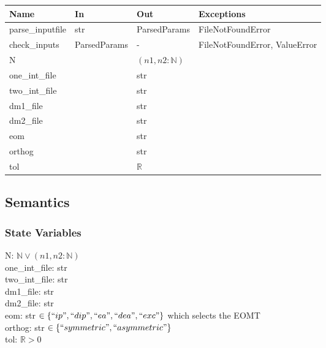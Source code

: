 \documentclass[12pt, titlepage]{article}
\begin{document}
\begin{center}
	\begin{tabular}{p{2.7cm} p{4cm} p{4cm} p{2cm}}
		\hline
		\textbf{Name} & \textbf{In} & \textbf{Out} & \textbf{Exceptions} \\
		\hline
		parse\_inputfile& str& ParsedParams & FileNotFoundError \\
		check\_inputs& ParsedParams& - & FileNotFoundError, ValueError \\
		N& & $(n1, n2:\mathbb{N})$ & \\
		one\_int\_file& & str & \\
		two\_int\_file& & str & \\
		dm1\_file& & str & \\
		dm2\_file& & str & \\
		eom& & str & \\
		orthog& & str & \\
		tol& & $\mathbb{R}$ & \\
		\hline
	\end{tabular}
\end{center}

\subsection{Semantics}

\subsubsection{State Variables}

N: $\mathbb{N} \lor (n1, n2:\mathbb{N})$\\
one\_int\_file: str\\
two\_int\_file: str\\
dm1\_file: str\\
dm2\_file: str\\
eom: str $\in \{``ip", ``dip", ``ea", ``dea", ``exc"\}$ which selects 
the 
EOMT\\
orthog: str $\in \{``symmetric", ``asymmetric"\}$\\
tol: $\mathbb{R} > 0$\\
\end{document}

